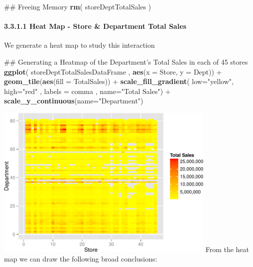 \documentclass[]{article}
\newenvironment{Shaded}{\begin{snugshade}}{\end{snugshade}}
\newcommand{\KeywordTok}[1]{\textcolor[rgb]{0.13,0.29,0.53}{\textbf{{#1}}}}
\newcommand{\DataTypeTok}[1]{\textcolor[rgb]{0.13,0.29,0.53}{{#1}}}
\newcommand{\StringTok}[1]{\textcolor[rgb]{0.31,0.60,0.02}{{#1}}}
\newcommand{\NormalTok}[1]{{#1}}
\begin{document}
\begin{Shaded}
\begin{Highlighting}[]
\NormalTok{## Freeing Memory}
\KeywordTok{rm}\NormalTok{( storeDeptTotalSales )}
\end{Highlighting}
\end{Shaded}

\paragraph{3.3.1.1 Heat Map - Store \& Department Total
Sales}\label{heat-map---store-department-total-sales}

We generate a heat map to study this interaction

\begin{Shaded}
\begin{Highlighting}[]
\NormalTok{## Generating a Heatmap of the Department's Total Sales in each of 45 stores}
\KeywordTok{ggplot}\NormalTok{( storeDeptTotalSalesDataFrame , }\KeywordTok{aes}\NormalTok{(}\DataTypeTok{x =} \NormalTok{Store, }\DataTypeTok{y =} \NormalTok{Dept)) +}\StringTok{ }
\StringTok{  }\KeywordTok{geom_tile}\NormalTok{(}\KeywordTok{aes}\NormalTok{(}\DataTypeTok{fill =} \NormalTok{TotalSales)) +}
\StringTok{  }\KeywordTok{scale_fill_gradient}\NormalTok{(}
    \DataTypeTok{low=}\StringTok{"yellow"}\NormalTok{, }\DataTypeTok{high=}\StringTok{"red"} \NormalTok{, }\DataTypeTok{labels =} \NormalTok{comma , }\DataTypeTok{name=}\StringTok{"Total Sales"}\NormalTok{) +}
\StringTok{  }\KeywordTok{scale_y_continuous}\NormalTok{(}\DataTypeTok{name=}\StringTok{"Department"}\NormalTok{)}
\end{Highlighting}
\end{Shaded}

\includegraphics[width=400px]{PredictingWeeklySalesAtWalmart_files/figure-latex/heatmapStoreDept-1}
From the heat map we can draw the following broad conclusions:
\end{document}
